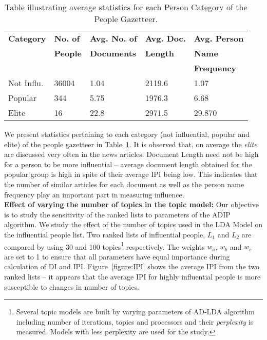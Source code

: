 
\begin{table}[t!]
\caption {Table illustrating average statistics for each Person Category of the People Gazetteer.}
\label{table:stats}
\resizebox{8cm}{!} {
\centering

    \begin{tabular}{|lllll|}
    \hline
    \textbf{Category}  &  \textbf{No. of }   & \textbf{Avg. No. of }   &  \textbf{Avg. Doc. }	&  \textbf{Avg. Person }	\\  
    & \textbf{People} & \textbf{Documents} & \textbf{Length} &  \textbf{Name } \\
    & & & & \textbf{Frequency} \\  \hline
Not Influ. & 36004 & 1.04 & 2119.6 & 1.07 	\\ \hline
 Popular & 344 & 5.75 & 1976.3 & 6.68  \\ \hline
Elite & 16 & 22.8 & 2971.5 & 29.870	 \\	\hline 
  \end{tabular}}
\vspace*{-10pt}
\end{table}

We present statistics pertaining to each category (not influential, popular and elite) of the people gazetteer in Table~\ref{table:stats}. 
It is observed that, on average the \emph{elite} are discussed very often in the news articles.
Document Length need not be high for a person to be more influential -- average document length obtained for the popular group is high in spite of their average IPI being low. This indicates that the number of similar articles for each document as well as the person name frequency play an important part in measuring influence.\\
\noindent \textbf{Effect of varying the number of topics in the topic model: } Our objective is to study the sensitivity of the ranked lists to parameters of the ADIP algorithm. We study the effect of the number of topics used in the LDA Model on the influential people list.
Two ranked lists of influential people, $L_1$ and $L_2$ are compared by using 30 and 100 topics\footnote{Several topic models are built by varying parameters of AD-LDA algorithm including number of iterations, topics and processors and their \emph{perplexity} is measured. Models with less perplexity are used for the study.} respectively. The weights $w_a$, $w_b$ and $w_c$ are set to 1 to ensure that all parameters have equal importance during calculation of DI and IPI. Figure~\ref{figure:IPI} shows the average IPI from the two ranked lists -- it appears that the average IPI for highly influential people is more susceptible to changes in number of topics.

